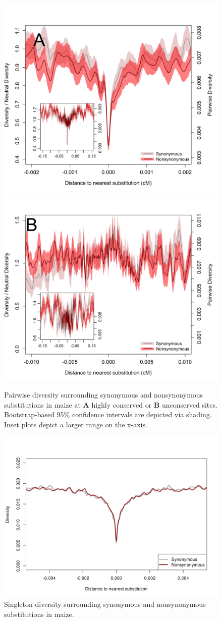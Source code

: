 \begin{figure}
  \includegraphics[width=.5\textwidth]{FigsAndFiles/plotDiversity_TvM_Conserved_Significance_June.png}
  \includegraphics[width=.5\textwidth]{FigsAndFiles/plotDiversity_TvM_Unconserved_Significance_June.png}
\caption{ Pairwise diversity surrounding synonymous and nonsynonymous
  substitutions in maize at \textbf{A} highly conserved or \textbf{B}  unconserved sites.  Bootstrap-based 95\% confidence intervals are depicted via shading. Inset plots depict a larger range on the x-axis. \label{sFig:consUncons}}
\end{figure}
\clearpage

\begin{figure}
  \includegraphics[width=\textwidth]{FigsAndFiles/plotDiversity_TvM_Singletons.png}
\caption{ Singleton diversity surrounding synonymous and nonsynonymous
  substitutions in maize. \label{sFig:singleton}}
\end{figure}
\clearpage

